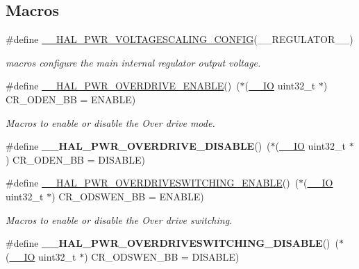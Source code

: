 \subsection*{Macros}
\begin{DoxyCompactItemize}
\item 
\#define \hyperlink{group___p_w_r_ex___exported___constants_ga1ee778f7ff494723bd0ef04ec44b0f77}{\+\_\+\+\_\+\+H\+A\+L\+\_\+\+P\+W\+R\+\_\+\+V\+O\+L\+T\+A\+G\+E\+S\+C\+A\+L\+I\+N\+G\+\_\+\+C\+O\+N\+F\+IG}(\+\_\+\+\_\+\+R\+E\+G\+U\+L\+A\+T\+O\+R\+\_\+\+\_\+)
\begin{DoxyCompactList}\small\item\em macros configure the main internal regulator output voltage. \end{DoxyCompactList}\item 
\#define \hyperlink{group___p_w_r_ex___exported___constants_gaa6904ae4fd3b27e546a1a9ca86fd0325}{\+\_\+\+\_\+\+H\+A\+L\+\_\+\+P\+W\+R\+\_\+\+O\+V\+E\+R\+D\+R\+I\+V\+E\+\_\+\+E\+N\+A\+B\+LE}()~($\ast$(\hyperlink{core__sc300_8h_aec43007d9998a0a0e01faede4133d6be}{\+\_\+\+\_\+\+IO} uint32\+\_\+t $\ast$) C\+R\+\_\+\+O\+D\+E\+N\+\_\+\+BB = E\+N\+A\+B\+LE)
\begin{DoxyCompactList}\small\item\em Macros to enable or disable the Over drive mode. \end{DoxyCompactList}\item 
\#define {\bfseries \+\_\+\+\_\+\+H\+A\+L\+\_\+\+P\+W\+R\+\_\+\+O\+V\+E\+R\+D\+R\+I\+V\+E\+\_\+\+D\+I\+S\+A\+B\+LE}()~($\ast$(\hyperlink{core__sc300_8h_aec43007d9998a0a0e01faede4133d6be}{\+\_\+\+\_\+\+IO} uint32\+\_\+t $\ast$) C\+R\+\_\+\+O\+D\+E\+N\+\_\+\+BB = D\+I\+S\+A\+B\+LE)\hypertarget{group___p_w_r_ex___exported___constants_ga1bfa0d1a811b22c638028e721a8f25fe}{}\label{group___p_w_r_ex___exported___constants_ga1bfa0d1a811b22c638028e721a8f25fe}

\item 
\#define \hyperlink{group___p_w_r_ex___exported___constants_ga1f5fd3a41a03c729b283bf05af030716}{\+\_\+\+\_\+\+H\+A\+L\+\_\+\+P\+W\+R\+\_\+\+O\+V\+E\+R\+D\+R\+I\+V\+E\+S\+W\+I\+T\+C\+H\+I\+N\+G\+\_\+\+E\+N\+A\+B\+LE}()~($\ast$(\hyperlink{core__sc300_8h_aec43007d9998a0a0e01faede4133d6be}{\+\_\+\+\_\+\+IO} uint32\+\_\+t $\ast$) C\+R\+\_\+\+O\+D\+S\+W\+E\+N\+\_\+\+BB = E\+N\+A\+B\+LE)
\begin{DoxyCompactList}\small\item\em Macros to enable or disable the Over drive switching. \end{DoxyCompactList}\item 
\#define {\bfseries \+\_\+\+\_\+\+H\+A\+L\+\_\+\+P\+W\+R\+\_\+\+O\+V\+E\+R\+D\+R\+I\+V\+E\+S\+W\+I\+T\+C\+H\+I\+N\+G\+\_\+\+D\+I\+S\+A\+B\+LE}()~($\ast$(\hyperlink{core__sc300_8h_aec43007d9998a0a0e01faede4133d6be}{\+\_\+\+\_\+\+IO} uint32\+\_\+t $\ast$) C\+R\+\_\+\+O\+D\+S\+W\+E\+N\+\_\+\+BB = D\+I\+S\+A\+B\+LE)\hypertarget{group___p_w_r_ex___exported___constants_gaadf09628cdf4a7c430a53eb850d42d70}{}\label{group___p_w_r_ex___exported___constants_gaadf09628cdf4a7c430a53eb850d42d70}


\end{DoxyCompactItemize}
